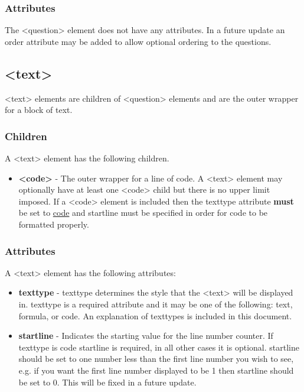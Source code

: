 \documentclass{article}
\begin{document}
	\subsubsection{Attributes}
	The {\textless}{question}{\textgreater} element does not have any attributes. In a future update an order attribute may be added to allow optional ordering to the questions.
	
	\subsection{{\textless}text{\textgreater}}
	{\textless}text{\textgreater} elements are children of {\textless}question{\textgreater} elements and are the outer wrapper for a block of text. 
	\subsubsection{Children}
	A {\textless}text{\textgreater} element has the following children.
	\begin{itemize}
		\item \textbf{{\textless}code{\textgreater}} - The outer wrapper for a line of code. A {\textless}text{\textgreater} element may optionally have at least one {\textless}code{\textgreater} child but there is no upper limit imposed. If a {\textless}code{\textgreater} element is included then the texttype attribute \textbf{must} be set to \underline{code} and startline must be specified in order for code to be formatted properly.
	\end{itemize}
	\subsubsection{Attributes}
	A {\textless}text{\textgreater} element has the following attributes:
	\begin{itemize}
		\item \textbf{texttype} - texttype determines the style that the {\textless}text{\textgreater} will be displayed in. texttype is a required attribute and it may be one of the following: text, formula, or code. An explanation of texttypes is included in this document.
		\item \textbf{startline} - Indicates the starting value for the line number counter. If texttype is code startline is required, in all other cases it is optional. startline should be set to one number less than the first line number you wish to see, e.g. if you want the first line number displayed to be 1 then startline should be set to 0. This will be fixed in a future update. 
	\end{itemize}
\end{document}
